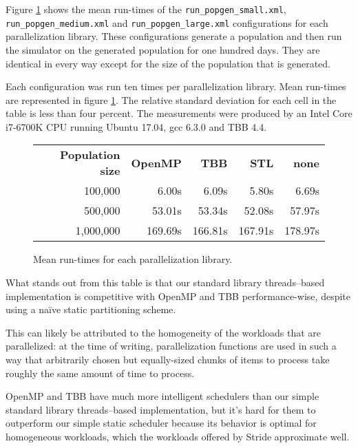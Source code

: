 Figure \ref{fig:parallelization-mean-runtimes} shows the mean run-times of the \texttt{run\_popgen\_small.xml}, \texttt{run\_popgen\_medium.xml} and \texttt{run\_popgen\_large.xml} configurations for each parallelization library. These configurations generate a population and then run the simulator on the generated population for one hundred days. They are identical in every way except for the size of the population that is generated.

Each configuration was run ten times per parallelization library. Mean run-times are represented in figure \ref{fig:parallelization-mean-runtimes}. The relative standard deviation for each cell in the table is less than four percent. The measurements were produced by an Intel Core i7-6700K CPU running Ubuntu 17.04, gcc 6.3.0 and TBB 4.4.

\begin{figure}[h]
	\begin{tabular}{r|r|r|r|r}
		\textbf{Population size} & \textbf{OpenMP} & \textbf{TBB} & \textbf{STL} & \textbf{none} \\
		100,000 & 6.00s & 6.09s & 5.80s & 6.69s \\
		500,000 & 53.01s & 53.34s & 52.08s & 57.97s \\
		1,000,000 & 169.69s & 166.81s & 167.91s & 178.97s
	\end{tabular}
	\label{fig:parallelization-mean-runtimes}
	\caption{Mean run-times for each parallelization library.}
\end{figure}

What stands out from this table is that our standard library threads--based implementation is competitive with OpenMP and TBB performance-wise, despite using a na\"ive static partitioning scheme.

This can likely be attributed to the homogeneity of the workloads that are parallelized: at the time of writing, parallelization functions are used in such a way that arbitrarily chosen but equally-sized chunks of items to process take roughly the same amount of time to process.

OpenMP and TBB have much more intelligent schedulers than our simple standard library threads--based implementation, but it's hard for them to outperform our simple static scheduler because its behavior is optimal for homogeneous workloads, which the workloads offered by Stride approximate well.